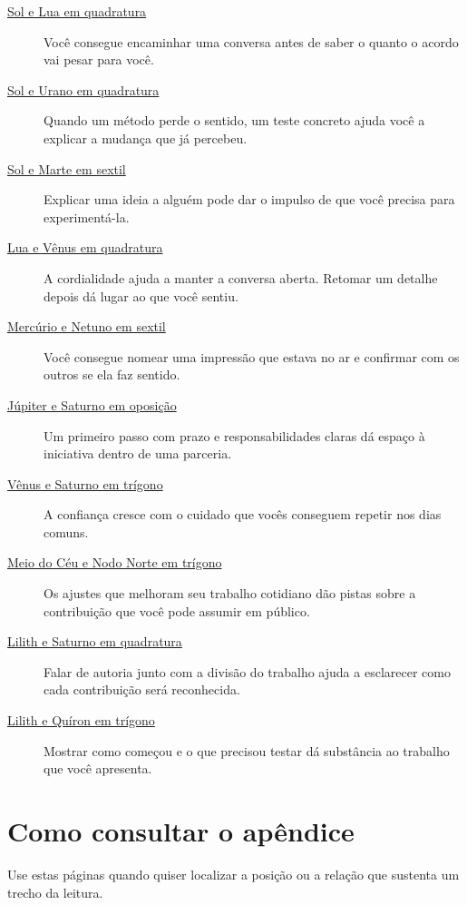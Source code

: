 \documentclass[11pt,a4paper]{article}
\begin{document}
\begin{description}
\item[{\hyperref[aspecto:sol-lua]{Sol e Lua em quadratura}}] Você consegue encaminhar uma conversa antes de saber o quanto o acordo vai pesar para você.
\item[{\hyperref[aspecto:sol-urano]{Sol e Urano em quadratura}}] Quando um método perde o sentido, um teste concreto ajuda você a explicar a mudança que já percebeu.
\item[{\hyperref[aspecto:sol-marte]{Sol e Marte em sextil}}] Explicar uma ideia a alguém pode dar o impulso de que você precisa para experimentá-la.
\item[{\hyperref[aspecto:lua-venus]{Lua e Vênus em quadratura}}] A cordialidade ajuda a manter a conversa aberta. Retomar um detalhe depois dá lugar ao que você sentiu.
\item[{\hyperref[aspecto:mercurio-netuno]{Mercúrio e Netuno em sextil}}] Você consegue nomear uma impressão que estava no ar e confirmar com os outros se ela faz sentido.
\item[{\hyperref[aspecto:jupiter-saturno]{Júpiter e Saturno em oposição}}] Um primeiro passo com prazo e responsabilidades claras dá espaço à iniciativa dentro de uma parceria.
\item[{\hyperref[aspecto:venus-saturno]{Vênus e Saturno em trígono}}] A confiança cresce com o cuidado que vocês conseguem repetir nos dias comuns.
\item[{\hyperref[aspecto:mc-nodo]{Meio do Céu e Nodo Norte em trígono}}] Os ajustes que melhoram seu trabalho cotidiano dão pistas sobre a contribuição que você pode assumir em público.
\item[{\hyperref[aspecto:lilith-saturno]{Lilith e Saturno em quadratura}}] Falar de autoria junto com a divisão do trabalho ajuda a esclarecer como cada contribuição será reconhecida.
\item[{\hyperref[aspecto:lilith-quiron]{Lilith e Quíron em trígono}}] Mostrar como começou e o que precisou testar dá substância ao trabalho que você apresenta.
\end{description}

\clearpage
\appendix
\section{Como consultar o apêndice}
Use estas páginas quando quiser localizar a posição ou a relação que sustenta um trecho da leitura.
\end{document}
